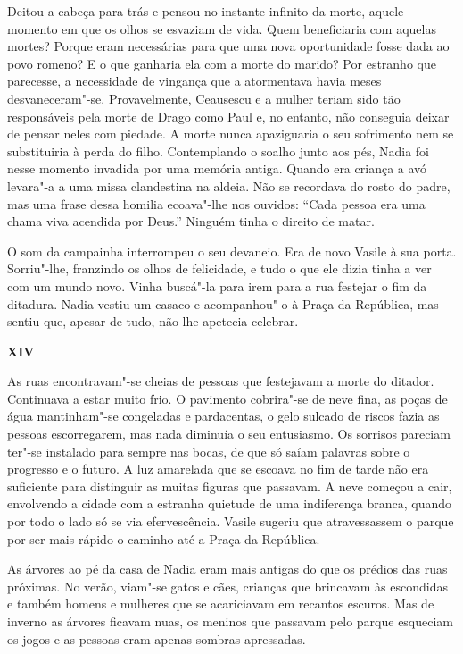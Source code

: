 Deitou a cabeça para trás e pensou no instante infinito da morte, aquele
momento em que os olhos se esvaziam de vida. Quem beneficiaria com
aquelas mortes? Porque eram necessárias para que uma nova oportunidade
fosse dada ao povo romeno? E o que ganharia ela com a morte do marido?
Por estranho que parecesse, a necessidade de vingança que a atormentava
havia meses desvaneceram"-se. Provavelmente, Ceausescu e a mulher teriam
sido tão responsáveis pela morte de Drago como Paul e, no entanto, não
conseguia deixar de pensar neles com piedade. A morte nunca apaziguaria
o seu sofrimento nem se substituiria à perda do filho. Contemplando o
soalho junto aos pés, Nadia foi nesse momento invadida por uma memória
antiga. Quando era criança a avó levara"-a a uma missa clandestina na
aldeia. Não se recordava do rosto do padre, mas uma frase dessa homilia
ecoava"-lhe nos ouvidos:
``Cada pessoa era uma chama viva acendida por Deus.''
Ninguém tinha o direito de matar.

O som da campainha interrompeu o seu devaneio. Era de novo Vasile à sua
porta. Sorriu"-lhe, franzindo os olhos de felicidade, e tudo o que ele
dizia tinha a ver com um mundo novo. Vinha buscá"-la para irem para a rua
festejar o fim da ditadura. Nadia vestiu um casaco e acompanhou"-o à
Praça da República, mas sentiu que, apesar de tudo, não lhe apetecia
celebrar.

\pagebreak
\thispagestyle{empty}
\movetooddpage
\vspace*{1.8cm}
\noindent{}\textbf{XIV}

\bigskip

\noindent{}As ruas encontravam"-se cheias de pessoas que festejavam a morte do
ditador. Continuava a estar muito frio. O pavimento cobrira"-se de neve
fina, as poças de água mantinham"-se congeladas e pardacentas, o gelo
sulcado de riscos fazia as pessoas escorregarem, mas nada diminuía o seu
entusiasmo. Os sorrisos pareciam ter"-se instalado para sempre nas bocas,
de que só saíam palavras sobre o progresso e o futuro. A luz amarelada
que se escoava no fim de tarde não era suficiente para distinguir as
muitas figuras que passavam. A neve começou a cair, envolvendo a cidade
com a estranha quietude de uma indiferença branca, quando por todo o
lado só se via efervescência. Vasile sugeriu que atravessassem o parque
por ser mais rápido o caminho até a Praça da República.

As árvores ao pé da casa de Nadia eram mais antigas
do que os prédios das ruas próximas. No verão, viam"-se gatos e cães,
crianças que brincavam às escondidas e também homens e mulheres que se
acariciavam em recantos escuros. Mas de inverno as árvores ficavam nuas,
os meninos que passavam pelo parque esqueciam os jogos e as pessoas eram apenas
sombras apressadas.

